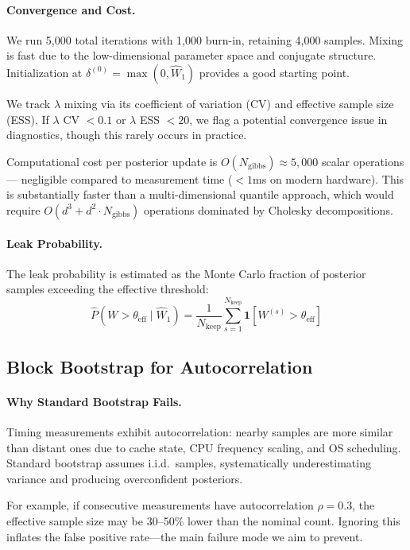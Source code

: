 \documentclass[letterpaper,twocolumn,10pt]{article}
\begin{document}
\paragraph{Convergence and Cost.}
We run 5{,}000 total iterations with 1{,}000 burn-in, retaining 4{,}000 samples. Mixing is fast due to
the low-dimensional parameter space and conjugate structure. Initialization at $\delta^{(0)} =
\max(0, \widehat{W}_1)$ provides a good starting point.

We track $\lambda$ mixing via its coefficient of variation (CV) and effective sample size (ESS).
If $\lambda$ CV $< 0.1$ or $\lambda$ ESS $< 20$, we flag a potential convergence issue in
diagnostics, though this rarely occurs in practice.

Computational cost per posterior update is $O(N_{\text{gibbs}}) \approx 5{,}000$ scalar operations---
negligible compared to measurement time ($<1$ms on modern hardware). This is substantially faster
than a multi-dimensional quantile approach, which would require $O(d^3 + d^2 \cdot N_{\text{gibbs}})$
operations dominated by Cholesky decompositions.

\paragraph{Leak Probability.}
The leak probability is estimated as the Monte Carlo fraction of posterior samples exceeding
the effective threshold:
\begin{equation}
\widehat{P}(W > \theta_{\text{eff}} \mid \widehat{W}_1) = \frac{1}{N_{\text{keep}}} \sum_{s=1}^{N_{\text{keep}}} \mathbf{1}\!\left[W^{(s)} > \theta_{\text{eff}}\right]
\end{equation}

\subsection{Block Bootstrap for Autocorrelation}
\label{app:bootstrap}

\paragraph{Why Standard Bootstrap Fails.}
Timing measurements exhibit autocorrelation: nearby samples are more similar than distant ones due to cache state, CPU frequency scaling, and OS scheduling. Standard bootstrap assumes i.i.d.\ samples, systematically underestimating variance and producing overconfident posteriors.

For example, if consecutive measurements have autocorrelation $\rho = 0.3$, the effective sample size may be 30--50\% lower than the nominal count. Ignoring this inflates the false positive rate---the main failure mode we aim to prevent.
\end{document}
